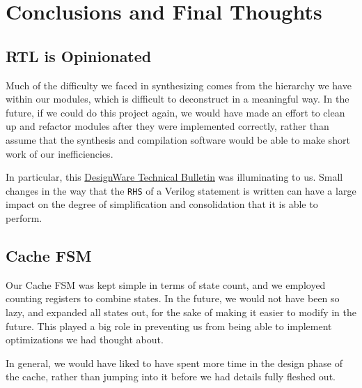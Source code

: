 \documentclass[11pt]{article}
\begin{document}
\section{Conclusions and Final Thoughts}
\label{sec:org7146de9}

\subsection{RTL is Opinionated}
\label{sec:org2931802}
Much of the difficulty we faced in synthesizing comes from the
hierarchy we have within our modules, which is difficult to
deconstruct in a meaningful way. In the future, if we could do this
project again, we would have made an effort to clean up and
refactor modules after they were implemented correctly, rather than
assume that the synthesis and compilation software would be able to
make short work of our inefficiencies.

In particular, this \href{https://www.synopsys.com/designware-ip/technical-bulletin/techniques-for-improving-qor.html}{DesignWare Technical Bulletin} was illuminating
to us. Small changes in the way that the \texttt{RHS} of a Verilog
statement is written can have a large impact on the degree of
simplification and consolidation that it is able to perform.

\subsection{Cache FSM}
\label{sec:org2545b82}
Our Cache FSM was kept simple in terms of state count, and we
employed counting registers to combine states. In the future, we
would not have been so lazy, and expanded all states out, for the
sake of making it easier to modify in the future. This played a big
role in preventing us from being able to implement optimizations we
had thought about.

In general, we would have liked to have spent more time in the
design phase of the cache, rather than jumping into it before we
had details fully fleshed out.
\end{document}
